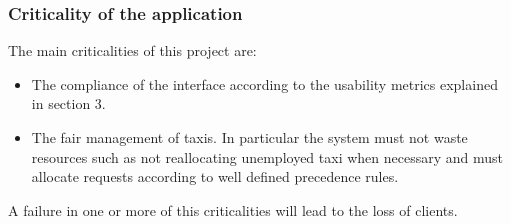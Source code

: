 \documentclass[11pt, a4paper,titlepage]{article}
\begin{document}
\subsubsection{Criticality of the application}
The main criticalities of this project are:
\begin{itemize}
	\item The compliance of the interface according to the usability metrics explained in section 3.
	\item The fair management of taxis. In particular the system must not waste resources such as not reallocating unemployed taxi when necessary and must allocate requests according to well defined precedence rules.
\end{itemize}
A failure in one or more of this criticalities will lead to the loss of clients.
\end{document}
